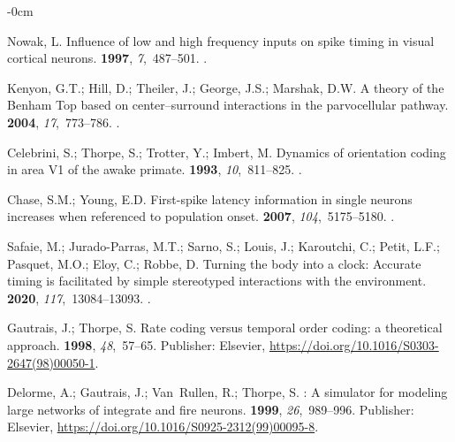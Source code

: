 \documentclass[brainsci, %
               review,submit,pdftex,moreauthors
               ]{Definitions/mdpi}
\begin{document}
\begin{adjustwidth}{-\extralength}{0cm}
\begin{thebibliography}{999}
  Nowak, L.
  \newblock Influence of low and high frequency inputs on spike timing in visual
    cortical neurons.
   {\bf 1997}, {\em 7},~487--501.
  .
  
  Kenyon, G.T.; Hill, D.; Theiler, J.; George, J.S.; Marshak, D.W.
  \newblock A theory of the {Benham} {Top} based on center–surround
    interactions in the parvocellular pathway.
   {\bf 2004}, {\em 17},~773--786.
  .
  
  Celebrini, S.; Thorpe, S.; Trotter, Y.; Imbert, M.
  \newblock Dynamics of orientation coding in area {V1} of the awake primate.
   {\bf 1993}, {\em 10},~811--825.
  .
  
  Chase, S.M.; Young, E.D.
  \newblock First-spike latency information in single neurons increases when
    referenced to population onset.
   {\bf 2007},
    {\em 104},~5175--5180.
  .
  
  Safaie, M.; Jurado-Parras, M.T.; Sarno, S.; Louis, J.; Karoutchi, C.; Petit,
    L.F.; Pasquet, M.O.; Eloy, C.; Robbe, D.
  \newblock Turning the body into a clock: {Accurate} timing is facilitated by
    simple stereotyped interactions with the environment.
   {\bf 2020},
    {\em 117},~13084--13093.
  .
  
  Gautrais, J.; Thorpe, S.
  \newblock Rate coding versus temporal order coding: a theoretical approach.
   {\bf 1998}, {\em 48},~57--65.
  \newblock Publisher: Elsevier,
    {\url{https://doi.org/10.1016/S0303-2647(98)00050-1}}.
  
  Delorme, A.; Gautrais, J.; Van~Rullen, R.; Thorpe, S.
  : {A} simulator for modeling large networks of integrate
    and fire neurons.
   {\bf 1999}, {\em 26},~989--996.
  \newblock Publisher: Elsevier,
    {\url{https://doi.org/10.1016/S0925-2312(99)00095-8}}.
  

\end{thebibliography}
\end{adjustwidth}
\end{document}
